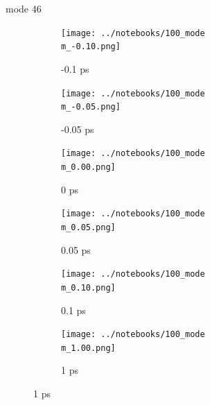 \documentclass{beamer}
\newcommand\w{0.32}
\begin{document}
\renewcommand\m{46}
\begin{frame}{mode \m}
	\begin{figure}
		\centering
		\begin{subfigure}[b]{\w\textwidth}
			\centering
			\texttt{[image: ../notebooks/100\_mode\\m\_-0.10.png]}
			\caption{-0.1 ps}
		\end{subfigure}
		\begin{subfigure}[b]{\w\textwidth}
			\centering
			\texttt{[image: ../notebooks/100\_mode\\m\_-0.05.png]}
			\caption{-0.05 ps}
		\end{subfigure}
		\begin{subfigure}[b]{\w\textwidth}
			\centering
			\texttt{[image: ../notebooks/100\_mode\\m\_0.00.png]}
			\caption{0 ps}
		\end{subfigure}
		\begin{subfigure}[b]{\w\textwidth}
			\centering
			\texttt{[image: ../notebooks/100\_mode\\m\_0.05.png]}
			\caption{0.05 ps}
		\end{subfigure}
		\begin{subfigure}[b]{\w\textwidth}
			\centering
			\texttt{[image: ../notebooks/100\_mode\\m\_0.10.png]}
			\caption{0.1 ps}
		\end{subfigure}
		\begin{subfigure}[b]{\w\textwidth}
			\centering
			\texttt{[image: ../notebooks/100\_mode\\m\_1.00.png]}
			\caption{1 ps}
		\end{subfigure}
	\end{figure}
\end{frame}
\end{document}
